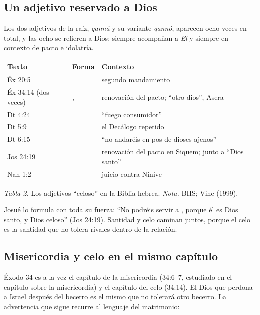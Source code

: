 \subsection{Un adjetivo reservado a Dios}
Los dos adjetivos de la raíz, \emph{qanná} y su variante \emph{qannó}, aparecen ocho veces en total, y las ocho se refieren a Dios: siempre acompañan a  \emph{El} y siempre en contexto de pacto e idolatría.

\begin{center}\small\renewcommand{\arraystretch}{1.15}
\begin{tabular}{@{}L{2.4cm}L{2.6cm}L{8.6cm}@{}}
\toprule
\textbf{Texto} & \textbf{Forma} & \textbf{Contexto} \\ \midrule
Éx 20:5 &  & segundo mandamiento \\
Éx 34:14 (dos veces) & ,  & renovación del pacto; ``otro dios'', Asera \\
Dt 4:24 &  & ``fuego consumidor'' \\
Dt 5:9 &  & el Decálogo repetido \\
Dt 6:15 &  & ``no andaréis en pos de dioses ajenos'' \\
Jos 24:19 &  & renovación del pacto en Siquem; junto a ``Dios santo'' \\
Nah 1:2 &  & juicio contra Nínive \\
\bottomrule
\end{tabular}\par
{\footnotesize\color{gris}\textit{Tabla 2.} Los adjetivos ``celoso'' en la Biblia hebrea. \textit{Nota.} BHS; Vine (1999).}
\end{center}

Josué lo formula con toda su fuerza: ``No podréis servir a \SENOR, porque él es Dios santo, y Dios celoso'' (Jos 24:19). Santidad y celo caminan juntos, porque el celo es la santidad que no tolera rivales dentro de la relación.

\subsection{Misericordia y celo en el mismo capítulo}
Éxodo 34 es a la vez el capítulo de la misericordia (34:6--7, estudiado en el capítulo sobre la misericordia) y el capítulo del celo (34:14). El Dios que perdona a Israel después del becerro es el mismo que no tolerará otro becerro. La advertencia que sigue recurre al lenguaje del matrimonio:

